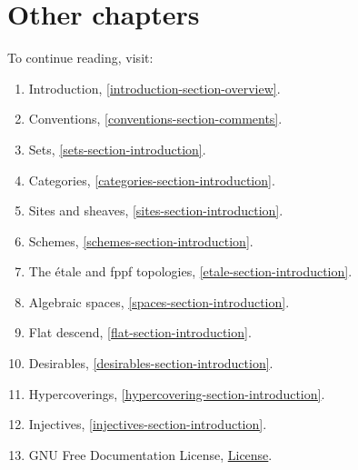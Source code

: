 \section{Other chapters}

\noindent
To continue reading, visit:
\begin{enumerate}
\item Introduction, \autoref{introduction-section-overview}.
\item Conventions, \autoref{conventions-section-comments}.
\item Sets, \autoref{sets-section-introduction}.
\item Categories, \autoref{categories-section-introduction}.
\item Sites and sheaves, \autoref{sites-section-introduction}.
\item Schemes, \autoref{schemes-section-introduction}.
\item The \'etale and fppf topologies, \autoref{etale-section-introduction}.
\item Algebraic spaces, \autoref{spaces-section-introduction}.
\item Flat descend, \autoref{flat-section-introduction}.
\item Desirables, \autoref{desirables-section-introduction}.
\item Hypercoverings, \autoref{hypercovering-section-introduction}.
\item Injectives, \autoref{injectives-section-introduction}.
\item GNU Free Documentation License, \hyperref[fdl-version]{License}.
\end{enumerate}
